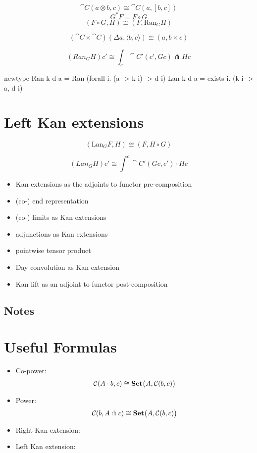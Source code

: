 \documentclass[DaoFP]{subfiles}
\begin{document}
\[ \cat C (a \otimes b, c) \cong \cat C (a, [b, c]) \]
\[ G^* F = F \circ G \]
\[ (F \circ G, H) \cong (F, \text{Ran}_G H) \]
 
 \[ (\cat C \times \cat C) (\Delta a , \langle b, c \rangle) \cong (a, b \times c) \]
 
 \[ (Ran_G H) c' \cong \int_c \cat C ' (c', G c) \pitchfork H c \]
 \begin{haskell}
 newtype Ran k d a = Ran (forall i. (a -> k i) -> d i)
 Lan k d a = exists i. (k i -> a, d i)
 \end{haskell}

\section{Left Kan extensions}
\[ (\text{Lan}_G F , H) \cong (F, H \circ G) \]

\[ (Lan_G H) c' \cong \int^{c} \cat C'(G c, c') \cdot H c \]


\begin{itemize}
\item Kan extensions as the adjoints to functor pre-composition
\item (co-) end representation

\item (co-) limits as Kan extensions

\item adjunctions as Kan extensions

\item pointwise tensor product

\item Day convolution as Kan extension

\item Kan lift as an adjoint to functor post-composition
\end{itemize}

\subsection{Notes}

\section{Useful Formulas}
\begin{itemize}
\item Co-power:
\[ \mathcal{C} (A \cdot b, c) \cong \mathbf{Set} \big( A, \mathcal{C} (b, c)\big) \]
\item Power:
\[ \mathcal{C} (b, A \pitchfork c) \cong \mathbf{Set}  \big(A, \mathcal{C}(b, c)\big) \]
\item Right Kan extension:
\item Left Kan extension:

\end{itemize}
\end{document}
